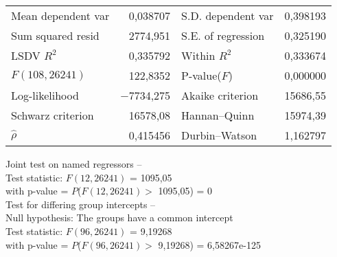 \begin{center}
\vspace{1ex}
\begin{tabular}{lrlr}
Mean dependent var &  0,038707 & S.D. dependent var &  0,398193 \\
Sum squared resid &  2774,951 & S.E. of regression &  0,325190 \\
LSDV $R^2$ &  0,335792 & Within $R^2$ &  0,333674 \\
$F(108, 26241)$ &  122,8352 & P-value($F$) &  0,000000 \\
Log-likelihood & $-$7734,275 & Akaike criterion &  15686,55 \\
Schwarz criterion &  16578,08 & Hannan--Quinn &  15974,39 \\
$\hat{\rho}$ &  0,415456 & Durbin--Watson &  1,162797 \\
\end{tabular}

\vspace{1em}
\begin{raggedright}
Joint test on named regressors --\\
\quad Test statistic: $F(12, 26241)$ = 1095,05\\
\quad with p-value = $P$($F(12, 26241) >$ 1095,05) = 0\\
\vspace{1ex}
Test for differing group intercepts --\\
\quad Null hypothesis: The groups have a common intercept\\
\quad Test statistic: $F(96, 26241)$ = 9,19268\\
\quad with p-value = $P$($F(96, 26241) >$ 9,19268) = 6,58267e-125\\
\vspace{1ex}
\end{raggedright}

\end{center}


